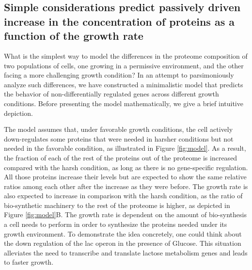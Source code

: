 \subsection{Simple considerations predict passively driven increase in the concentration of proteins as a function of the growth rate}
What is the simplest way to model the differences in the proteome composition of two populations of cells, one growing in a permissive environment, and the other facing a more challenging growth condition?
In an attempt to parsimoniously analyze such differences, we have constructed a minimalistic model that predicts the behavior of non-differentially regulated genes across different growth conditions.
Before presenting the model mathematically, we give a brief intuitive depiction.

The model assumes that, under favorable growth conditions, the cell actively down-regulates some proteins that were needed in harsher conditions but not needed in the favorable condition, as illustrated in Figure \ref{fig:model}.
As a result, the fraction of each of the rest of the proteins out of the proteome is increased compared with the harsh condition, as long as there is no gene-specific regulation. All those proteins increase their levels but are expected to show the same relative ratios among each other after the increase as they were before. 
The growth rate is also expected to increase in comparison with the harsh condition, as the ratio of bio-synthetic machinery to the rest of the proteome is higher, as  depicted in Figure \ref{fig:model}B.
The growth rate is dependent on the amount of bio-synthesis a cell needs to perform in order to synthesize the proteins needed under its growth environment. 
To demonstrate the idea concretely, one could think about the down regulation of the lac operon in the presence of Glucose. This situation alleviates the need to transcribe and translate lactose metabolism genes and leads to faster growth.